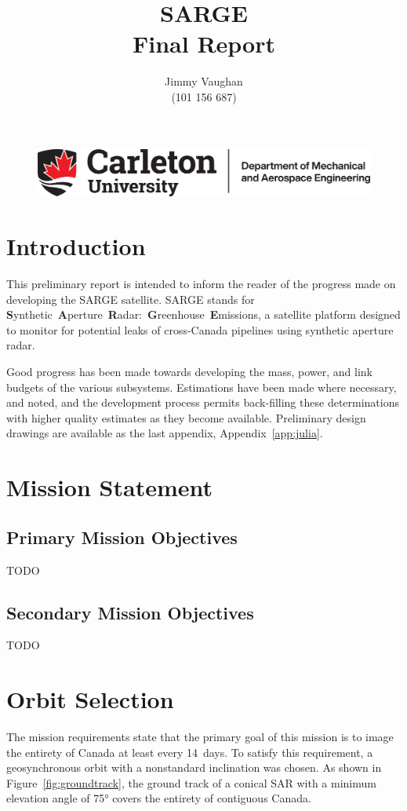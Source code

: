 \documentclass[9pt]{article}
\title{\Huge SARGE\\\Large Final Report}
\author{Jimmy Vaughan\\(101 156 687)}
\begin{document}
\begin{figure}[t]
  \centering
  \includegraphics[width=.7\linewidth]{CarletonLogo}
\end{figure}
\maketitle
\tableofcontents
{}
\clearpage
{}
\section{Introduction}
This preliminary report is intended to inform the reader of the progress made on developing the SARGE satellite.
SARGE stands for \textbf{S}ynthetic~\textbf{A}perture~\textbf{R}adar:~\textbf{G}reenhouse~\textbf{E}missions, a satellite platform designed to monitor for potential leaks of cross-Canada pipelines using synthetic aperture radar.

Good progress has been made towards developing the mass, power, and link budgets of the various subsystems.
Estimations have been made where necessary, and noted, and the development process permits back-filling these determinations with higher quality estimates as they become available.
Preliminary design drawings are available as the last appendix, Appendix~\ref{app:julia}.

\section{Mission Statement}
\subsection{Primary Mission Objectives}
TODO
\subsection{Secondary Mission Objectives}
TODO

\section{Orbit Selection}
The mission requirements state that the primary goal of this mission is to image the entirety of Canada at least every 14~days.
To satisfy this requirement, a geosynchronous orbit with a nonstandard inclination was chosen.
As shown in Figure~\ref{fig:groundtrack}, the ground track of a conical SAR with a minimum elevation angle of \ang{75} covers the entirety of contiguous Canada.
\end{document}

